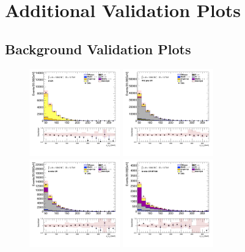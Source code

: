 \chapter{Additional Validation Plots}\label{app:valid-plots}

	\clearpage
	\section{\taujets Background Validation Plots}\label{sec:taujet-valid-plots}
		\clearpage

		\begin{figure}[!htp]
			\begin{center}    
			\includegraphics[width=0.35\textwidth]{chapters/chapter6_HPlus/images/taujets/tau_0_pt_TTBAR.png}
			\includegraphics[width=0.35\textwidth]{chapters/chapter6_HPlus/images/taujets/tau_0_pt_WJETS.png} \\
			\includegraphics[width=0.35\textwidth]{chapters/chapter6_HPlus/images/taujets/tau_0_pt_BVETO.png}
			\includegraphics[width=0.35\textwidth]{chapters/chapter6_HPlus/images/taujets/tau_0_pt_BVETO_MT100.png} \\

\end{center}
\end{figure}
